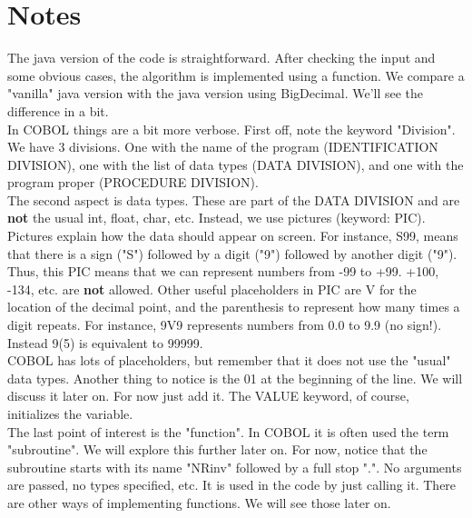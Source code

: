 \documentclass[letter,12pt]{article}
\begin{document}
\section{Notes}
The java version of the code is straightforward. After checking the input and some obvious cases, the algorithm is implemented using a function.
We compare a "vanilla" java version with the java version using BigDecimal. We'll see the difference in a bit.\\
In COBOL things are a bit more verbose. First  off, note the keyword "Division". We have 3 divisions. One  with the name of the program (IDENTIFICATION DIVISION), 
one with the list of data types (DATA DIVISION), and one with the program proper (PROCEDURE DIVISION).\\
The second aspect is data types. These are part of the DATA DIVISION and are \textbf{not} the usual  int, float, char, etc. Instead, we use pictures (keyword: PIC).
Pictures explain how the data should appear on screen. For instance, S99, means that there is a sign ("S") followed by a digit ("9") followed by another digit ("9").
Thus, this PIC means that we can represent numbers from -99 to +99.  +100, -134, etc. are \textbf{not} allowed. 
Other useful placeholders in PIC are V for the location of the decimal point, and the parenthesis to represent how many times a digit repeats. 
For instance, 9V9 represents numbers from 0.0 to 9.9 (no sign!). Instead 9(5) is equivalent to 99999.\\
COBOL has lots of placeholders, but remember that it does not use the "usual"  data types. Another thing to notice is the 01 at the beginning of the line.
We will discuss it later on. For now just add it. The VALUE keyword, of course, initializes the variable.\\
The last point of interest is the "function". In COBOL it is often used the term "subroutine". We will explore this further later on. 
For now, notice that the subroutine starts with its name "NRinv" followed by a full stop ".". No arguments are passed, no types specified, etc.
It is used in the code by just calling it. There are other ways of implementing functions. We will see those later on.\\
\end{document}
